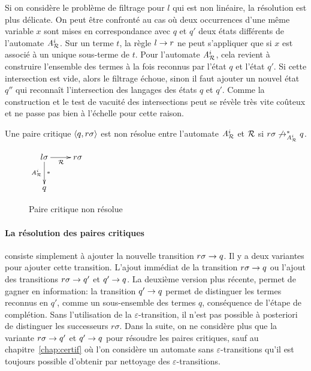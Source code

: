 Si on considère le problème de filtrage pour $l$ qui est non linéaire, la résolution est plus
délicate. On peut être confronté au cas où deux occurrences d'une même variable $x$
sont mises en correspondance avec $q$ et $q'$ deux états différents de l'automate ${\mathit A}_{\mathcal R}^i$. 
Sur un terme $t$, la règle $l\rightarrow r$ ne peut s'appliquer que si $x$ est associé à un unique sous-terme
de $t$. Pour l'automate ${\mathit A}_{\mathcal R}^i$, cela revient à construire l'ensemble des termes à la fois reconnus
par l'état $q$ et l'état $q'$. Si cette intersection est vide, alors le filtrage échoue, 
sinon il faut ajouter un nouvel état $q''$ qui reconnaît l'intersection des langages des états $q$ et $q'$.
Comme la construction et le test de vacuité des intersections peut se révèle très vite coûteux et ne passe
pas bien à l'échelle pour cette raison.

\begin{definition}
  Une paire critique $\langle q, r\sigma\rangle$ est non résolue entre l'automate ${\mathit A}_{\mathcal R}^i$ et $\mathcal R$ si $r\sigma \not\rightarrow_{{\mathit A}_{\mathcal R}^i}^* q$.
  \begin{figure}[ht!]
    \centering
    $
    \xymatrix{
      l\sigma \ar[r]_{\R}\ar[d]^{*}_{\aaex^i} & r\sigma \\%
      q & %
    }
    $
    \caption{\footnotesize Paire critique non résolue\label{fig:cp}}
  \end{figure}  
\end{definition}

\paragraph{La résolution des paires critiques} consiste simplement à ajouter la nouvelle transition $r\sigma \rightarrow q$.
Il y a deux variantes pour ajouter cette transition. L'ajout immédiat de la transition $r\sigma \rightarrow q$
ou l'ajout des transitions $r\sigma \rightarrow q'$ et $q' \rightarrow q$. La deuxième version plus récente, permet de 
gagner en information: la transition $q' \rightarrow q$ permet de distinguer les termes reconnus en $q'$, comme 
un sous-ensemble des termes $q$, conséquence de l'étape de complétion. Sans l'utilisation de la $\varepsilon$-transition,
il n'est pas possible à posteriori de distinguer les successeurs $r\sigma$. 
Dans la suite, on ne considère plus que la variante $r\sigma \rightarrow q'$ et $q' \rightarrow q$ pour résoudre les paires critiques,
sauf au chapitre~\ref{chap:certif} où l'on considère un automate  sans $\varepsilon$-transitions
qu'il est toujours possible d'obtenir par nettoyage des $\varepsilon$-transitions.

